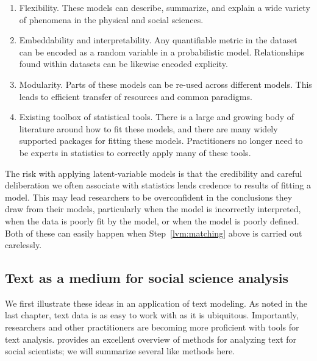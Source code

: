   \begin{enumerate}
    \item Flexibility. These models can describe, summarize, and explain
    a wide variety of phenomena in the physical and social sciences.
  \item Embeddability and interpretability.  Any quantifiable metric
    in the dataset can be encoded as a random variable in a
    probabilistic model.  Relationships
    found within datasets can be likewise encoded
    explicity. \label{lvm:matching}
    \item Modularity. Parts of these models can be re-used across
      different models.  This leads to efficient transfer of resources
      and common paradigms.
    \item Existing toolbox of statistical tools. There is a large and
      growing body of literature around how to fit these models, and
      there are many widely supported packages for fitting these
      models.  Practitioners no longer need to be experts in
      statistics to correctly apply many of these tools.
  \end{enumerate}

  The risk with applying latent-variable models is that the
  credibility and careful deliberation we often associate with
  statistics lends credence to results of fitting a model.  This may
  lead researchers to be overconfident in the conclusions they draw
  from their models, particularly when the model is incorrectly
  interpreted, when the data is poorly fit by the model, or when the
  model is poorly defined.  Both of these can easily happen when
  Step~\ref{lvm:matching} above is carried out carelessly.

\subsection{Text as a medium for social science analysis}
  \label{sec:text_intro}
  We first illustrate these ideas in an application of text modeling.
  As noted in the last chapter, text data is as easy to work with as
  it is ubiquitous. Importantly, researchers and other practitioners
  are becoming more proficient with tools for text analysis.
  \cite{grimmer:submitted} provides an excellent overview of methods
  for analyzing text for social scientists; we will summarize several
  like methods here.

  
